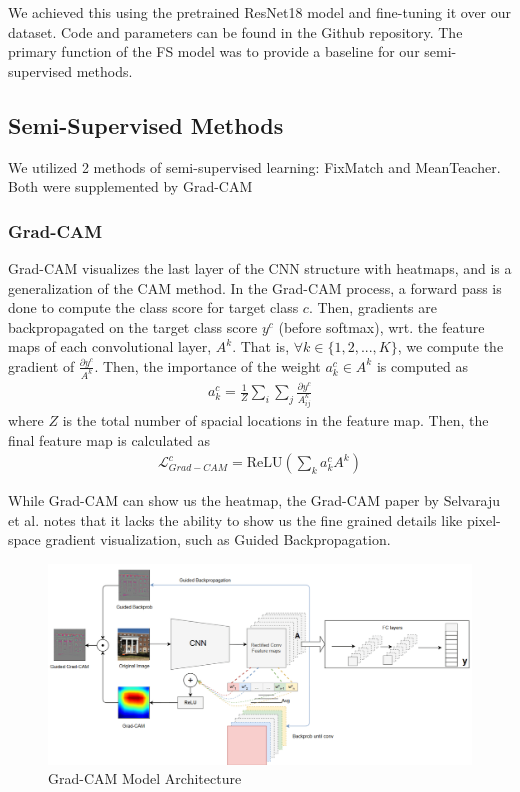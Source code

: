 \documentclass{article}
\begin{document}
We achieved this using the pretrained ResNet18 model and fine-tuning it over our dataset. Code and parameters can be found in the Github repository. The primary function of the FS model was to provide a baseline for our semi-supervised methods.

\subsection{Semi-Supervised Methods}

We utilized 2 methods of semi-supervised learning: FixMatch and MeanTeacher. Both were supplemented by Grad-CAM

\subsubsection{Grad-CAM}

Grad-CAM visualizes the last layer of the CNN structure with heatmaps, and is a generalization of the CAM method. In the Grad-CAM process, a forward pass is done to compute the class score for target class $c$. Then, gradients are backpropagated on the target class score $y^c$ (before softmax), wrt. the feature maps of each convolutional layer, $A^k$. That is, $\forall k \in \{1, 2, ..., K\}$, we compute the gradient of $\frac{\partial y^c}{A^k}$. Then, the importance of the weight $a_k^c\in A^k$ is computed as \begin{align*}
    a_k^c=\frac{1}{Z}\sum_i\sum_j\frac{\partial y^c}{A_{ij}^k}
\end{align*} where $Z$ is the total number of spacial locations in the feature map. Then, the final feature map is calculated as \begin{align*}
    \mathcal{L}_{Grad-CAM}^c=\text{ReLU}\left(\sum_k a_k^cA^k\right)
\end{align*}

While Grad-CAM can show us the heatmap, the Grad-CAM paper by Selvaraju et al. \cite{selvaraju} notes that it lacks the ability to show us the fine grained details like pixel-space gradient visualization, such as Guided Backpropagation. 


\begin{figure}[H]
    \centering
    \includegraphics[width=0.8\linewidth]{model_architecture.png}
    \caption{Grad-CAM Model Architecture}
    \label{fig:gradcam_architecture}
\end{figure}
\end{document}
